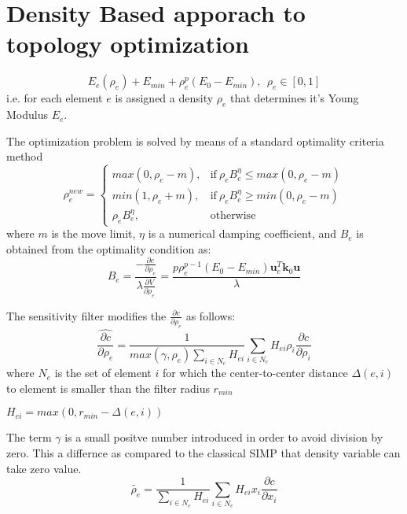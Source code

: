 \documentclass{article}
\begin{document}
\section{Density Based apporach to topology optimization}
\begin{equation*}
    E_{e}(\rho_e) + E_{min} + \rho_{e}^p(E_0 - E_{min}), \ \  \rho_e \in [0,1]
\end{equation*}
i.e. for each element $e$ is assigned a density $\rho_e$ that determines it's Young Modulus $E_e$.

The optimization problem is solved by means of a standard optimality criteria method
\begin{equation*}
    \rho_{e}^{new}=
    \begin{cases}
        max(0, \rho_{e}-m),   & \text{if} \ \rho_{e}B_{e}^{\eta}\leq max(0, \rho_{e}-m) \\
        min(1, \rho_{e}+m),   & \text{if} \ \rho_{e}B_{e}^{\eta}\geq min(0, \rho_{e}-m) \\
        \rho_{e}B_{e}^{\eta}, & \text{otherwise}
    \end{cases}
\end{equation*}
where $m$ is the move limit, $\eta$ is a numerical damping coefficient, and $B_e$ is obtained from the optimality condition as:
\begin{equation*}
    B_e = \frac{-\frac{\partial c}{\partial \rho_e}}{\lambda\frac{\partial V}{\partial \rho_e}} = \frac{p\rho_{e}^{p-1}(E_0 - E_{min})\bm{u}_{e}^T\bm{k}_0\bm{u}}{\lambda}
\end{equation*}

The sensitivity filter modifies the $\frac{\partial c}{\partial \rho_e}$ as follows:
\begin{equation*}
    \widehat{\frac{\partial c}{\partial \rho_e}} = \frac{1}{max(\gamma, \rho_e)\sum_{i\in N_e}H_{ei}}\sum_{i \in N_e}H_{ei}\rho_{i}\frac{\partial c}{\partial \rho_i}
\end{equation*}
where $N_e$ is the set of element $i$ for which the center-to-center distance $\Delta(e,i)$ to element is smaller than the filter radius $r_{min}$

$H_{ei} = max(0,r_{min}-\Delta(e,i))$

The term $\gamma$ is a small positve number introduced in order to avoid division by zero. This a differnce as compared to the classical SIMP that density variable can take zero value.
\begin{equation*}
    \tilde{\rho_e} = \frac{1}{\sum_{i\in N_e}H_{ei}}\sum_{i \in N_e}H_{ei}x_i\frac{\partial c}{\partial x_i}
\end{equation*}
\end{document}
